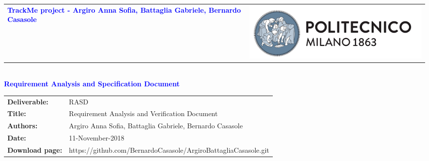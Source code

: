 




\begin{titlepage}


{\begin{table}[t!]
\centering
\begin{tabu} to \textwidth { X[1.3,r,p] X[1.7,l,p] }
\textcolor{Blue}{\textbf{\small{TrackMe project - Argiro Anna Sofia, Battaglia Gabriele, Bernardo Casasole}}} & \includegraphics[scale=0.5]{images/PolimiLogo}
\end{tabu}
\end{table}}~\\ [7cm]


\centering
{\textcolor{Blue}{\textbf{\Huge{Requirement Analysis and Specification Document}}}} \\ [1cm]

\end{titlepage}

\begin{table}[h!]
\begin{tabu} to \textwidth { X[0.3,r,p] X[0.7,l,p] }
\hline

\textbf{Deliverable:} & RASD\\
\textbf{Title:} & Requirement Analysis and Verification Document \\
\textbf{Authors:} & Argiro Anna Sofia, Battaglia Gabriele, Bernardo Casasole \\
\textbf{Date:} & 11-November-2018 \\
\textbf{Download page:} & https://github.com/BernardoCasasole/ArgiroBattagliaCasasole.git \\
\hline
\end{tabu}
\end{table}

\setcounter{page}{2}

\newpage
{}
\tableofcontents

